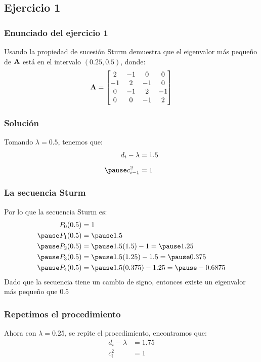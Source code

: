 \documentclass[12pt]{beamer}
\begin{document}
\subsection{Ejercicio 1}

\begin{frame}
\frametitle{Enunciado del ejercicio 1}
Usando la propiedad de sucesión Sturm demuestra que el eigenvalor más pequeño de $\vb{A}$ está en el intervalo $(0.25, 0.5)$, donde:
\pause
\begin{align*}
\vb{A} = 
\begin{bmatrix}
2 & -1 & 0 & 0 \\
-1 & 2 & -1 & 0 \\
0 & -1 & 2 & -1 \\
0 & 0 & -1 & 2
\end{bmatrix}
\end{align*}
\end{frame}
\begin{frame}
\frametitle{Solución}
Tomando $\lambda = 0.5$, \pause tenemos que:
\pause
\begin{eqnarray*}
\begin{aligned}
d_{i} - \lambda &= 1.5 \\[0.5em] \pause
c_{i-1}^{2} &= 1
\end{aligned}
\end{eqnarray*}
\end{frame}
\begin{frame}
\frametitle{La secuencia Sturm}
Por lo que la secuencia Sturm es:
\begin{eqnarray*}
\begin{aligned}
P_{0} (0.5) &= 1 \\ \pause 
P_{1} (0.5) &= \pause 1.5 \\ \pause 
P_{2} (0.5) &= \pause 1.5 (1.5) - 1 =  \pause 1.25 \\ \pause 
P_{3} (0.5) &= \pause 1.5 (1.25) - 1.5 = \pause 0.375 \\ \pause 
P_{4} (0.5) &= \pause 1.5 (0.375) - 1.25 = \pause -0.6875
\end{aligned}
\end{eqnarray*}
\pause
Dado que la secuencia tiene un cambio de signo, entonces existe un eigenvalor más pequeño que $0.5$
\end{frame}
\begin{frame}
\frametitle{Repetimos el procedimiento}
Ahora con $\lambda = 0.25$, se repite el procedimiento, encontramos que:
\pause
\begin{align*}
d_{i} - \lambda &= 1.75 \\
c_{i}^{2} &= 1
\end{align*}
\end{frame}
\end{document}
